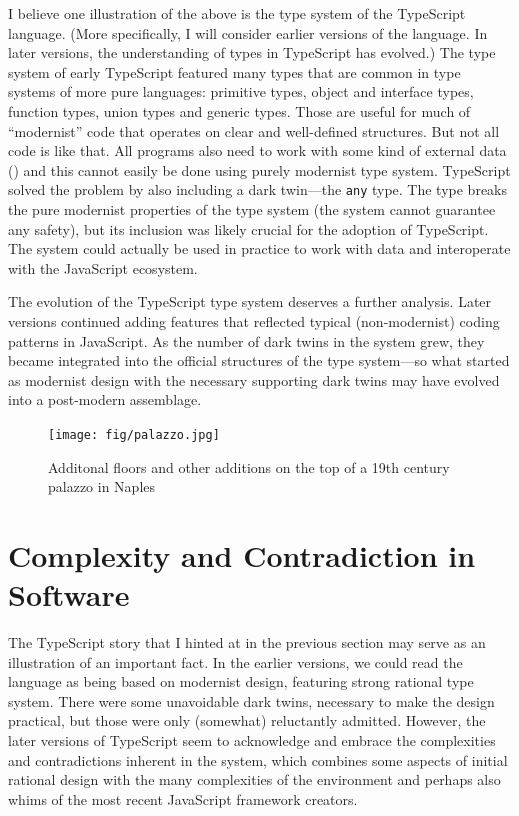 I believe one illustration of the above is the type system of the TypeScript language.
(More specifically, I will consider earlier versions of the language. In later versions, the
understanding of types in TypeScript has evolved.) The type system of early TypeScript
featured many types that are common in type systems of more pure languages: primitive types,
object and interface types, function types, union types and generic types. Those are useful
for much of ``modernist'' code that operates on clear and well-defined structures. But not
all code is like that. All programs also need to work with some kind of external data
() and this cannot easily be done using purely modernist type system.
TypeScript solved the problem by also including a dark twin---the \texttt{any} type. The type
breaks the pure modernist properties of the type system (the system cannot guarantee any safety),
but its inclusion was likely crucial for the adoption of TypeScript. The system could actually
be used in practice to work with data and interoperate with the JavaScript ecosystem.

The evolution of the TypeScript type system deserves a further analysis. Later versions
continued adding features that reflected typical (non-modernist) coding patterns
in JavaScript. As the number of dark twins in the system grew, they became integrated into the
official structures of the type system---so what started as modernist design with the necessary
supporting dark twins may have evolved into a post-modern assemblage.

\begin{figure}
  \centering
  \texttt{[image: fig/palazzo.jpg]}
  \caption{Additonal floors and other additions on the top of a 19th century palazzo in Naples}
  \label{fig:palazzo}
\end{figure}

\section{Complexity and Contradiction in Software}

The TypeScript story that I hinted at in the previous section may serve as an illustration of an
important fact. In the earlier versions, we could read the language as being based on modernist
design, featuring strong rational type system. There were some unavoidable dark twins, necessary
to make the design practical, but those were only (somewhat) reluctantly admitted. However, the
later versions of TypeScript seem to acknowledge and embrace the complexities and contradictions
inherent in the system, which combines some aspects of initial rational design with the many
complexities of the environment and perhaps also whims of the most recent JavaScript framework
creators.

